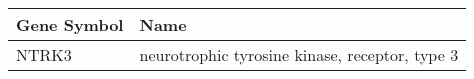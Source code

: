 \begin{tabular}{ll}
\toprule
Gene Symbol &                                           Name \\
\midrule
      NTRK3 & neurotrophic tyrosine kinase, receptor, type 3 \\
\bottomrule
\end{tabular}
